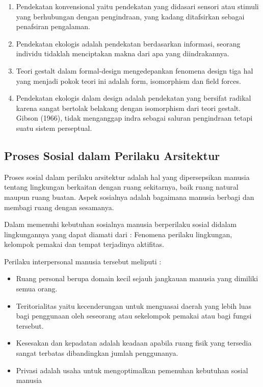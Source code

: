 \documentclass[../manperil.tex]{subfiles}
\begin{document}
\begin{enumerate}
	\item Pendekatan konvensional yaitu pendekatan yang didasari sensori atau stimuli yang berhubungan dengan pengindraan, yang kadang ditafsirkan sebagai penafsiran pengalaman.
	\item Pendekatan ekologis adalah pendekatan berdasarkan informasi, seorang individu tidaklah menciptakan makna dari apa yang diindrakannya.
	\item Teori gestalt dalam formal-design mengedepankan fenomena design tiga hal yang menjadi pokok teori ini adalah form, isomorphism dan field forces.
	\item Pendekatan ekologis dalam design adalah pendekatan yang bersifat radikal karena sangat bertolak belakang dengan isomorphism dari teori gestalt. Gibson (1966), tidak menganggap indra sebagai saluran pengindraan tetapi suatu sistem perseptual.
\end{enumerate}

\subsection{Proses Sosial dalam Perilaku Arsitektur}%
\label{sub:proses_sosial_dalam_perilaku_arsitektur}

Proses sosial dalam perilaku arsitektur adalah hal yang dipersepsikan manusia tentang lingkungan berkaitan dengan ruang sekitarnya, baik ruang natural maupun ruang buatan. Aspek sosialnya adalah bagaimana manusia berbagi dan membagi ruang dengan sesamanya.

Dalam memenuhi kebutuhan sosialnya manusia berperilaku sosial didalam lingkungannya yang dapat diamati dari : Fenomena perilaku lingkungan, kelompok pemakai dan tempat terjadinya aktifitas.

Perilaku interpersonal manusia tersebut meliputi :

\begin{itemize}
	\item Ruang personal berupa domain kecil sejauh jangkauan manusia yang dimiliki semua orang.
	\item Teritorialitas yaitu kecenderungan untuk menguasai daerah yang lebih luas bagi penggunaan oleh seseorang atau sekelompok pemakai atau bagi fungsi tersebut.
	\item Kesesakan dan kepadatan adalah keadaan apabila ruang fisik yang tersedia sangat terbatas dibandingkan jumlah penggunanya.
	\item Privasi adalah usaha untuk mengoptimalkan pemenuhan kebutuhan sosial manusia
\end{itemize}
\end{document}

